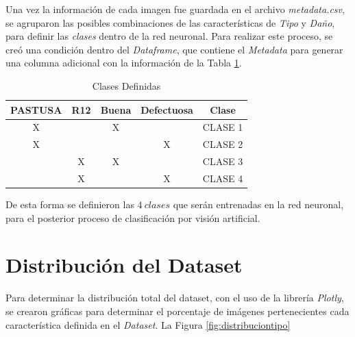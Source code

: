 	Una vez la información de cada imagen fue guardada en el archivo \textit{metadata.csv}, se agruparon las posibles combinaciones de las características de \textit{Tipo} y \textit{Daño}, para definir las \textit{clases} dentro de la red neuronal. Para realizar este proceso, se creó una condición dentro del \textit{Dataframe}, que contiene el \textit{Metadata} para generar una columna adicional con la información de la Tabla \ref{table:Clases}.	
	
	\begin{table}[ht]
		\centering
		\begin{tabular}{|c|c|c|c|c|}
			\hline
			PASTUSA & R12 & Buena & Defectuosa & Clase \\
			\hline
			X &  & X &  & CLASE 1 \\
			\hline
			X &  &  & X & CLASE 2 \\
			\hline
			& X & X &  & CLASE 3 \\
			\hline
			& X &  & X & CLASE 4 \\
			\hline
		\end{tabular}	
		\caption{Clases Definidas}
		\label{table:Clases}
	\end{table}	

De esta forma se definieron las $4 \ clases$ que serán entrenadas en la red neuronal, para el posterior proceso de clasificación por visión artificial. 


\newpage
\section{Distribución del Dataset}
	  
	Para determinar la distribución total del dataset, con el uso de la librería \textit{Plotly}, se crearon gráficas para determinar el porcentaje de imágenes pertenecientes cada característica definida en el \textit{Dataset}. La Figura \ref{fig:distribuciontipo}
		
